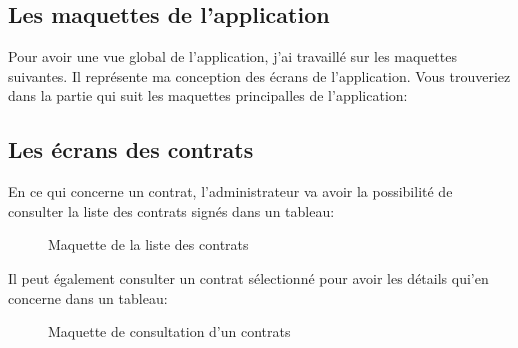 \documentclass[a4paper]{report}
\begin{document}
\begin{doublespace}
	\section{Les maquettes de l'application}

	Pour avoir une vue global de l'application, j'ai travaillé sur les maquettes suivantes. Il représente ma
	conception des écrans de l'application. Vous trouveriez dans la partie qui suit les maquettes principalles
	de l'application:

	\subsection{Les écrans des contrats}

	En ce qui concerne un contrat, l'administrateur va avoir la possibilité de consulter la liste des contrats signés dans un tableau:
	\begin{figure}[H]
		\begin{center}
			\caption{Maquette de la liste des contrats}
		\end{center}
	\end{figure}

	Il peut également consulter un contrat sélectionné pour avoir les détails qui'en concerne dans un tableau:
	\begin{figure}[H]
		\begin{center}
			\caption{Maquette de consultation d'un contrats}
		\end{center}
	\end{figure}


\end{doublespace}
\end{document}
